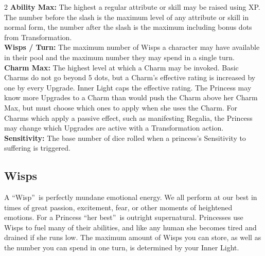 \begin{multicols}{2}
\noindent \textbf{Ability Max:} The highest a regular attribute or skill may be raised using XP. The number before the slash is the maximum level of any attribute or skill in normal form, the number after the slash is the maximum including bonus dots from Transformation.\\

\noindent \textbf{Wisps / Turn:} The maximum number of Wisps a character may have available in their pool and the maximum number they may spend in a single turn.\\

\noindent \textbf{Charm Max:} The highest level at which a Charm may be invoked. Basic Charms do not go beyond 5 dots, but a Charm's effective rating is increased by one by every Upgrade. Inner Light caps the effective rating. The Princess may know more Upgrades to a Charm than would push the Charm above her Charm Max, but must choose which ones to apply when she uses the Charm. For Charms which apply a passive effect, such as manifesting Regalia, the Princess may change which Upgrades are active with a Transformation action.\\

\noindent \textbf{Sensitivity:} The base number of dice rolled when a princess's Sensitivity to suffering is triggered. \\

\subsection*{Wisps}
\label{subsec:Wisps} 

A \textquotedblleft Wisp\textquotedblright\, is perfectly mundane emotional energy. We all perform at our best in times of great passion, excitement, fear, or other moments of heightened emotions. For a Princess \textquotedblleft her best\textquotedblright\, is outright supernatural. Princesses use Wisps to fuel many of their abilities, and like any human she becomes tired and drained if she runs low. The maximum amount of Wisps you can store, as well as the number you can spend in one turn, is determined by your Inner Light. 


\end{multicols}
